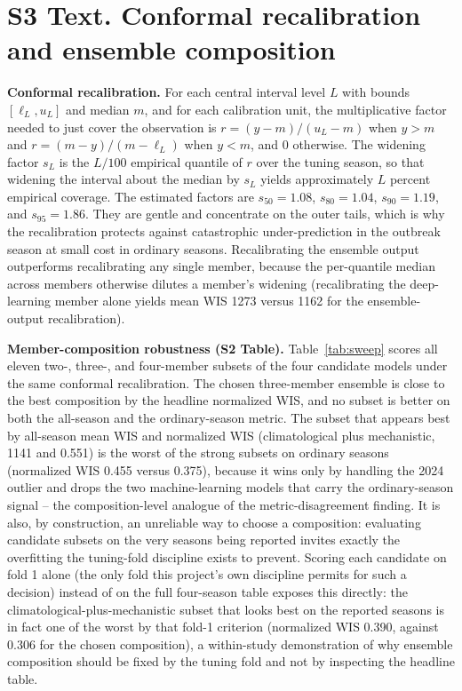 \documentclass[11pt]{article}
\begin{document}
\section*{S3 Text. Conformal recalibration and ensemble composition}
\textbf{Conformal recalibration.} For each central interval level $L$ with bounds $[\ell_L,u_L]$ and
median $m$, and for each calibration unit, the multiplicative factor needed to just cover the
observation is $r=(y-m)/(u_L-m)$ when $y>m$ and $r=(m-y)/(m-\ell_L)$ when $y<m$, and $0$ otherwise. The
widening factor $s_L$ is the $L/100$ empirical quantile of $r$ over the tuning season, so that widening
the interval about the median by $s_L$ yields approximately $L$ percent empirical coverage. The
estimated factors are $s_{50}=1.08$, $s_{80}=1.04$, $s_{90}=1.19$, and $s_{95}=1.86$. They are gentle
and concentrate on the outer tails, which is why the recalibration protects against catastrophic
under-prediction in the outbreak season at small cost in ordinary seasons. Recalibrating the ensemble
output outperforms recalibrating any single member, because the per-quantile median across members
otherwise dilutes a member's widening (recalibrating the deep-learning member alone yields mean WIS
1273 versus 1162 for the ensemble-output recalibration).

\noindent\textbf{Member-composition robustness (S2 Table).} Table~\ref{tab:sweep} scores all eleven
two-, three-, and four-member subsets of the four candidate models under the same conformal
recalibration. The chosen three-member ensemble is close to the
best composition by the headline normalized WIS, and no subset is better on both the all-season and the
ordinary-season metric. The subset that appears best by all-season mean WIS and normalized WIS
(climatological plus mechanistic, 1141 and 0.551) is the worst of the strong subsets on ordinary
seasons (normalized WIS 0.455 versus 0.375), because it wins only by handling the 2024 outlier and
drops the two machine-learning models that carry the ordinary-season signal -- the composition-level
analogue of the metric-disagreement finding. It is also, by construction, an unreliable way to choose
a composition: evaluating candidate subsets on the very seasons being reported invites exactly the
overfitting the tuning-fold discipline exists to prevent. Scoring each candidate on fold 1 alone
(the only fold this project's own discipline permits for such a decision) instead of on the full
four-season table exposes this directly: the climatological-plus-mechanistic subset that looks best
on the reported seasons is in fact one of the worst by that fold-1 criterion (normalized WIS 0.390,
against 0.306 for the chosen composition), a within-study demonstration of why ensemble composition
should be fixed by the tuning fold and not by inspecting the headline table.
\end{document}
